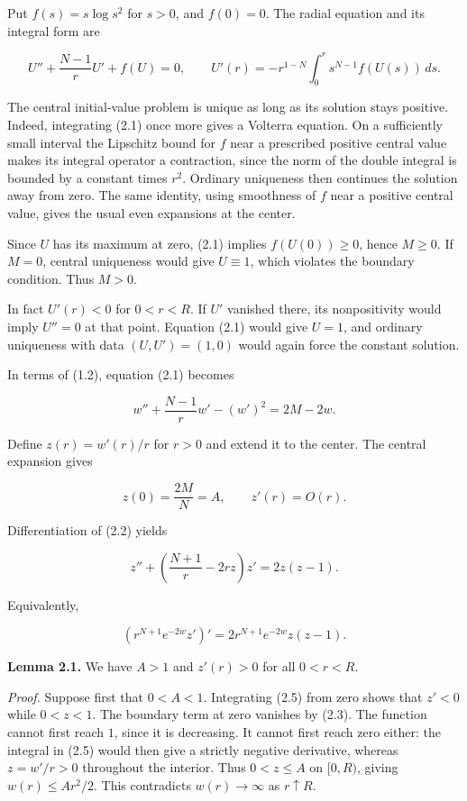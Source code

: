 \documentclass[11pt]{article}
\begin{document}
Put \(f(s)=s\log s^2\) for \(s>0\), and \(f(0)=0\). The radial equation
and its integral form are

\[
U''+\frac{N-1}{r}U'+f(U)=0,
\qquad
U'(r)=-r^{1-N}\int_0^r s^{N-1}f(U(s))\,ds.
\tag{2.1}
\]

The central initial-value problem is unique as long as its solution
stays positive. Indeed, integrating (2.1) once more gives a Volterra
equation. On a sufficiently small interval the Lipschitz bound for \(f\)
near a prescribed positive central value makes its integral operator a
contraction, since the norm of the double integral is bounded by a
constant times \(r^2\). Ordinary uniqueness then continues the solution
away from zero. The same identity, using smoothness of \(f\) near a
positive central value, gives the usual even expansions at the center.

Since \(U\) has its maximum at zero, (2.1) implies \(f(U(0))\geq0\),
hence \(M\geq0\). If \(M=0\), central uniqueness would give
\(U\equiv1\), which violates the boundary condition. Thus \(M>0\).

In fact \(U'(r)<0\) for \(0<r<R\). If \(U'\) vanished there, its
nonpositivity would imply \(U''=0\) at that point. Equation (2.1) would
give \(U=1\), and ordinary uniqueness with data \((U,U')=(1,0)\) would
again force the constant solution.

In terms of (1.2), equation (2.1) becomes

\[
w''+\frac{N-1}{r}w'-(w')^2=2M-2w.
\tag{2.2}
\]

Define \(z(r)=w'(r)/r\) for \(r>0\) and extend it to the center. The
central expansion gives

\[
z(0)=\frac{2M}{N}=A,\qquad z'(r)=O(r).
\tag{2.3}
\]

Differentiation of (2.2) yields

\[
z''+\left(\frac{N+1}{r}-2rz\right)z'=2z(z-1).
\tag{2.4}
\]

Equivalently,

\[
\left(r^{N+1}e^{-2w}z'\right)'
=2r^{N+1}e^{-2w}z(z-1).
\tag{2.5}
\]

\textbf{Lemma 2.1.} We have \(A>1\) and \(z'(r)>0\) for all \(0<r<R\).

\emph{Proof.} Suppose first that \(0<A<1\). Integrating (2.5) from zero
shows that \(z'<0\) while \(0<z<1\). The boundary term at zero vanishes
by (2.3). The function cannot first reach \(1\), since it is decreasing.
It cannot first reach zero either: the integral in (2.5) would then give
a strictly negative derivative, whereas \(z=w'/r>0\) throughout the
interior. Thus \(0<z\leq A\) on \([0,R)\), giving \(w(r)\leq Ar^2/2\).
This contradicts \(w(r)\to\infty\) as \(r\uparrow R\).
\end{document}
